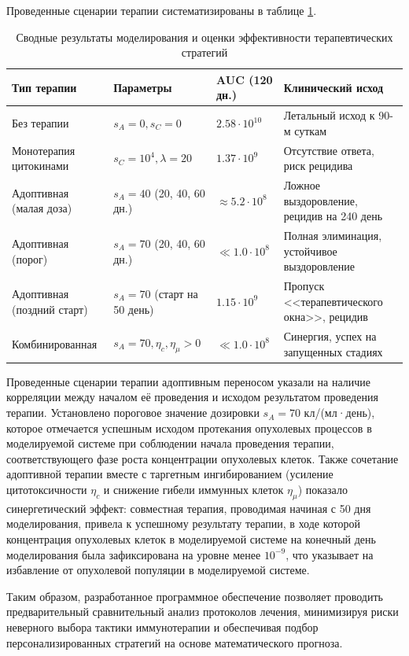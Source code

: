 Проведенные сценарии терапии систематизированы в таблице \ref{tab:therapy_results}.

\begin{table}[htbp]
  \centering
  \caption{Сводные результаты моделирования и оценки эффективности
  терапевтических стратегий}
  \label{tab:therapy_results}
  \begin{tabular}{|p{4cm}|p{3cm}|p{3cm}|p{4cm}|}
    \hline
    Тип терапии & Параметры & AUC (120 дн.) & Клинический исход \\ \hline
    Без терапии & $s_A=0, s_C=0$ & $2.58 \cdot 10^{10}$ & Летальный исход к
    90-м суткам \\ \hline
    Монотерапия цитокинами & $s_C=10^4, \lambda=20$ & $1.37 \cdot 10^9$ &
    Отсутствие ответа, риск рецидива \\ \hline
    Адоптивная (малая доза) & $s_A=40$ (20, 40, 60 дн.) & $\approx 5.2 \cdot
    10^8$ & Ложное выздоровление, рецидив на 240 день \\ \hline
    Адоптивная (порог) & $s_A=70$ (20, 40, 60 дн.) & $\ll 1.0 \cdot 10^8$ &
    Полная элиминация, устойчивое выздоровление \\ \hline
    Адоптивная (поздний старт) & $s_A=70$ (старт на 50 день) & $1.15 \cdot
    10^9$ & Пропуск <<терапевтического окна>>, рецидив \\ \hline
    Комбинированная & $s_A=70, \eta_c, \eta_{\mu} > 0$ & $\ll 1.0 \cdot 10^8$ &
    Синергия, успех на запущенных стадиях \\ \hline
  \end{tabular}
\end{table}

Проведенные сценарии терапии адоптивным переносом указали на наличие корреляции
между началом её проведения и исходом результатом проведения терапии.
Установлено пороговое значение дозировки $s_A=70$ кл/(мл·день), которое
отмечается успешным исходом протекания опухолевых процессов в моделируемой системе
при соблюдении начала проведения терапии, соответствующего фазе роста
концентрации опухолевых клеток. Также сочетание адоптивной терапии вместе с
таргетным ингибированием (усиление цитотоксичности $\eta_c$ и снижение
гибели иммунных клеток $\eta_{\mu}$) показало синергетический эффект:
совместная терапия, проводимая начиная с 50 дня моделирования, привела к
успешному результату терапии, в ходе которой концентрация опухолевых клеток в
моделируемой системе на конечный день моделирования была зафиксирована на
уровне менее $10^{-9}$, что указывает на избавление от опухолевой популяции в
моделируемой системе.

Таким образом, разработанное программное обеспечение позволяет проводить предварительный
сравнительный анализ протоколов лечения, минимизируя риски неверного выбора
тактики иммунотерапии и обеспечивая подбор персонализированных стратегий на
основе математического прогноза.